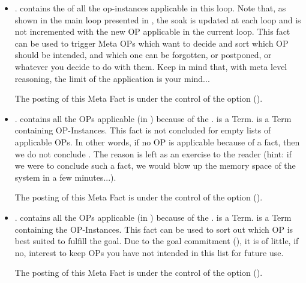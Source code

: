 \begin{itemize}

\item
{}. 
contains the  of all the op-instances applicable in this loop.
Note that, as shown in the main loop presented in , the soak is updated at each loop and is not incremented with
the new OP applicable in the current loop. This fact can be used to
trigger Meta OPs which want to decide and sort which OP should be
intended, and which one can be forgotten, or postponed, or whatever you
decide to do with them. Keep in mind that, with meta level reasoning, the
limit of the application is your mind...

The posting of this Meta Fact is under the control of the 
option ().

\item
{}.
 contains all the OPs applicable (in
) because of the .   is
a  Term.  is a
 Term containing OP-Instances. This fact is not
concluded for empty lists of applicable OPs. In other words, if no OP is
applicable because of a fact, then we do not conclude
. The reason is left as an
exercise to the reader (hint: if we were to conclude such a fact, we would
blow up the memory space of the system in a few minutes...).

The posting of this Meta Fact is under the control of the 
option ().

\item {}.
 contains all the OPs applicable (in
) because of the .  is a
 Term.  is a 
Term containing the OP-Instances. This fact can be used to sort out which
OP is best suited to fulfill the goal. Due to the goal commitment
(), it is of little, if no, interest to keep
OPs you have not intended in this list for future use.

The posting of this Meta Fact is under the control of the 
option ().


\end{itemize}
